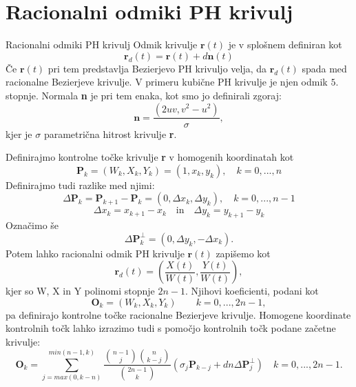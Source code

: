 \documentclass[12pt]{article}
\begin{document}
\section{Racionalni odmiki PH krivulj}
Racionalni odmiki PH krivulj
Odmik krivulje $\textbf{r}(t)$ je v splošnem definiran kot
$$\textbf{r}_d(t) = \textbf{r}(t) + d \textbf{n}(t)$$
Če $\textbf{r}(t)$ pri tem predstavlja Bezierjevo PH krivuljo velja, 
da $\textbf{r}_d(t)$ spada med racionalne Bezierjeve krivulje. V primeru kubične PH krivulje 
je njen odmik $5.$ stopnje. Normala \textbf{n} je pri tem enaka, kot smo jo definirali zgoraj:
$$\textbf{n} =\frac{(2uv, v^2 - u^2)}{\sigma},$$
kjer je $\sigma$ parametrična hitrost krivulje \textbf{r}.

Definirajmo kontrolne točke krivulje \textbf{r} v homogenih koordinatah kot
$$ \textbf{P}_k = (W_k, X_k, Y_k) = (1, x_k, y_k), \quad k = 0, ..., n$$
Definirajmo tudi razlike med njimi:
$$\Delta \textbf{P}_k = \textbf{P}_{k+1}-\textbf{P}_k = (0, \Delta x_k, \Delta y_k), \quad k = 0, ..., n-1$$ 
$$\Delta x_k = x_{k+1} - x_k \quad \text{in} \quad \Delta y_k = y_{k+1} - y_k$$
Označimo še $$ \Delta \textbf{P}_k^{\perp} = (0, \Delta y_k, - \Delta x_k).$$ 
Potem lahko racionalni odmik PH krivulje $\textbf{r}(t)$ zapišemo kot
$$ \textbf{r}_d(t) = \left(\frac{X(t)}{W(t)}, \frac{Y(t)}{W(t)}\right),$$
kjer so W, X in Y polinomi stopnje $2n -1$. Njihovi koeficienti, podani kot
$$ \textbf{O}_k = (W_k, X_k, Y_k) \quad  \quad k = 0, ..., 2n-1,$$
pa definirajo kontrolne točke racionalne Bezierjeve krivulje. 
Homogene koordinate kontrolnih točk lahko izrazimo tudi s pomočjo kontrolnih točk podane začetne krivulje:
$$ \textbf{O}_k = \sum_{j=max(0,k-n)}^{min(n-1,k)}{\frac{\binom{n-1}{j}\binom{n}{k-j}}{\binom{2n-1}{k}}(\sigma_j \textbf{P}_{k-j}+d n \Delta \textbf{P}^{\perp}_{j})} \quad k = 0, ..., 2n-1.$$
\end{document}
